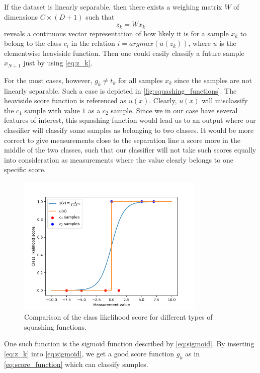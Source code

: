 \documentclass{article}
\begin{document}
If the dataset is linearly separable, then there exists a weighing matrix $W$ of dimensions $C \times (D+1)$ such
that
\begin{equation}
    z_k = Wx_k \label{eq:z_k}
\end{equation}
reveals a continuous vector representation of how likely it is for a sample $x_k$ to belong to the class
$c_i$ in the relation $i = argmax(u(z_k))$, where $u$ is the elementwise heaviside function. Then one could
easily classify a future sample $x_{N+1}$ just by using \eqref{eq:z_k}.

For the most cases, however, $g_k \neq t_k $ for all samples $x_k$ since the samples are not linearly
separable. Such a case is depicted in \autoref{fig:squashing_functions}. The heaviside score function is referenced
as $u(x)$. Clearly, $u(x)$ will misclassify the $c_1$ sample with value $1$ as a $c_2$ sample. Since
we in our case have several features of interest, this squashing function would lead us to an output
where our classifier will classify some samples as belonging to two classes. It would be more
correct to give measurements close to the separation line a score more in the middle of the two classes,
such that our classifier will not take such scores equally into consideration as measurements where
the value clearly belongs to one specific score.

\begin{figure}
    \centering
    \includegraphics[width=0.8\textwidth]{../images/squashing_functions.png}
    \caption{Comparison of the class likelihood score for different types of squashing functions.}
    \label{fig:squashing_functions}
\end{figure}

One such function is the sigmoid function described by \eqref{eq:sigmoid}. By inserting \eqref{eq:z_k}
into \eqref{eq:sigmoid}, we get a good score function $g_k$ as in \eqref{eq:score_function}
which can classify samples.
\end{document}
